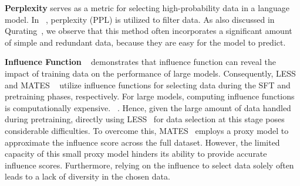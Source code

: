 \documentclass{article} %
\begin{document}


\textbf{Perplexity} serves as a metric for selecting high-probability data in a language model. In ~\citep{chen2024towards, marion2023less, muennighoff2024scaling, wenzek2019ccnet}, perplexity (PPL) is utilized to filter data. As also discussed in Qurating~\citep{wettig2024qurating}, we observe that this method often incorporates a significant amount of simple and redundant data, because they are easy for the model to predict.

\textbf{Influence Function} 
~\citep{grosse2023studying, choe2024your} demonstrates that influence function can reveal the impact of training data on the performance of large models. Consequently, LESS~\citep{xialess} and MATES ~\citep{yu2024mates} utilize influence functions for selecting data during the SFT and pretraining phases, respectively. For large models, computing influence functions is computationally expensive. ~\citep{grosse2023studying}. Hence, given the large amount of data handled during pretraining, directly using LESS~\citep{xialess} for data selection at this stage poses considerable difficulties. To overcome this, MATES~\citep{yu2024mates} employs a proxy model to approximate the influence score across the full dataset. 
However, the limited capacity of this small proxy model hinders its ability to provide accurate influence scores.
%
Furthermore, relying on the influence to select data solely often leads to a lack of diversity in the chosen data. %
\end{document}
